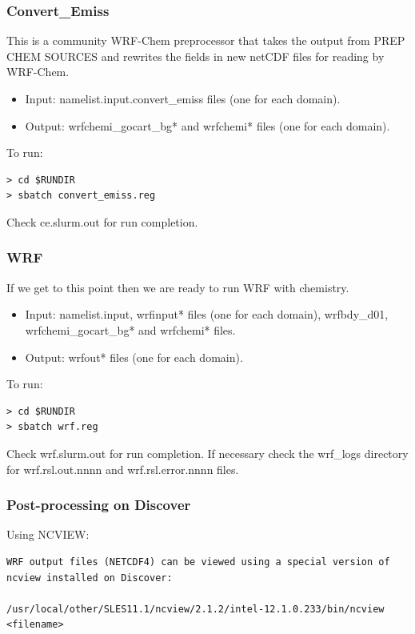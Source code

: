 \begin{frame}[fragile]\frametitle{Convert\_Emiss}

\footnotesize{
This is a community WRF-Chem preprocessor that takes the output from PREP CHEM SOURCES and rewrites the fields in new netCDF files for reading by WRF-Chem.
\begin{itemize}
\item Input: namelist.input.convert\_emiss files (one for each domain).
\item Output: wrfchemi\_gocart\_bg* and wrfchemi* files (one for each domain).
\end{itemize}
}    
\hrulefill\par
\footnotesize{To run:}
\begin{lstlisting}
> cd $RUNDIR
> sbatch convert_emiss.reg
\end{lstlisting}
Check ce.slurm.out  for run completion.


\end{frame}

\begin{frame}[fragile]\frametitle{WRF}

\footnotesize{
\hrulefill\par       
If we get to this point then we are ready to run WRF with chemistry.
\begin{itemize}
\item Input: namelist.input, wrfinput* files (one for each domain), wrfbdy\_d01, wrfchemi\_gocart\_bg* and wrfchemi* files.
\item Output: wrfout* files (one for each domain).
\end{itemize}
}    
\hrulefill\par
\footnotesize{To run:}
\begin{lstlisting}
> cd $RUNDIR
> sbatch wrf.reg
\end{lstlisting}
Check wrf.slurm.out for run completion.
If necessary check the wrf\_logs directory for wrf.rsl.out.nnnn and wrf.rsl.error.nnnn files.

\end{frame}

\begin{frame}[fragile]
\frametitle{Post-processing on Discover}

Using NCVIEW:

\begin{lstlisting}
WRF output files (NETCDF4) can be viewed using a special version of ncview installed on Discover:

/usr/local/other/SLES11.1/ncview/2.1.2/intel-12.1.0.233/bin/ncview <filename>
\end{lstlisting}

\end{frame}

